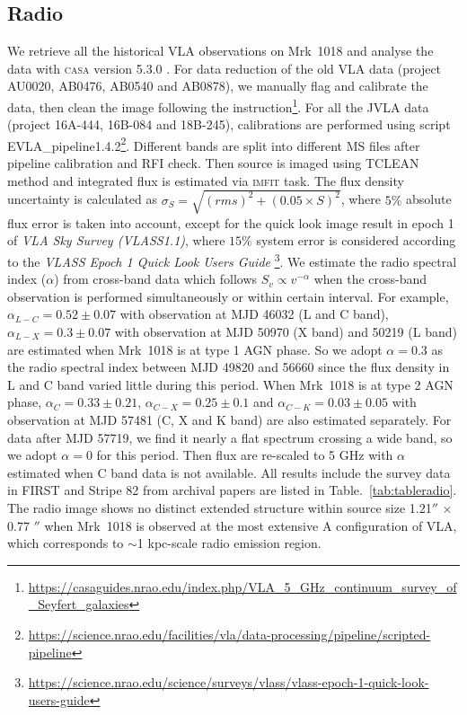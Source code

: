 \documentclass[twocolumn]{aastex63}
\begin{document}
\subsection{Radio}
\label{subsec:vla}
We retrieve all the historical VLA observations on Mrk~1018 and analyse the data with \textsc{casa} version 5.3.0 \citep{2007ASPC..376..127M}. For data reduction of the old VLA data (project AU0020, AB0476, AB0540 and AB0878), we manually flag and calibrate the data, then clean the image following the instruction\footnote{\url{https://casaguides.nrao.edu/index.php/VLA_5_GHz_continuum_survey_of_Seyfert_galaxies}}. For all the JVLA data (project 16A-444, 16B-084 and 18B-245), calibrations are performed using script {EVLA\_pipeline1.4.2}\footnote{\url{https://science.nrao.edu/facilities/vla/data-processing/pipeline/scripted-pipeline}}. Different bands are split into different MS files after pipeline calibration and RFI check. Then source is imaged using {\scriptsize TCLEAN} method and integrated flux is estimated via \textsc{imfit} task. The flux density uncertainty is calculated as $\sigma_{S}=\sqrt{(rms)^2+(0.05\times S)^2}$, where $5 \%$ absolute flux error is taken into account, except for the quick look image result in epoch 1 of  {\em VLA Sky Survey (VLASS1.1)}, where $15 \%$ system error is considered according to the {\em VLASS Epoch 1 Quick Look Users Guide} \footnote{\url{https://science.nrao.edu/science/surveys/vlass/vlass-epoch-1-quick-look-users-guide}}. We estimate the radio spectral index ($\alpha$) from cross-band data which follows $S_v \propto v^{-\alpha}$  when the cross-band observation is performed simultaneously or within certain interval. For example, $\alpha_{L-C} =0.52 \pm 0.07$ with observation at MJD 46032 (L and C band), $\alpha_{L-X} =0.3 \pm 0.07$ with observation at MJD 50970 (X band) and 50219 (L band) are estimated when Mrk~1018 is at type 1 AGN phase. So we adopt $\alpha=0.3$ as the radio spectral index between MJD 49820 and 56660 since the flux density in L and C band varied little during this period. When Mrk~1018 is at type 2 AGN phase, $\alpha_{C} =0.33\pm0.21$, $\alpha_{C-X} =0.25\pm0.1$ and $\alpha_{C-K} =0.03\pm0.05$ with observation at MJD 57481 (C, X and K band) are also estimated separately. For data after MJD 57719, we find it nearly a flat spectrum crossing a wide band, so we adopt $\alpha=0$ for this period. Then flux are re-scaled to 5 GHz with $\alpha$ estimated when C band data is not available.  All results include the survey data in FIRST\citep{1994ASPC...61..165B,1995ApJ...450..559B} and Stripe 82\citep{2011AJ....142....3H} from archival papers are listed in Table.~\ref{tab:tableradio}. The radio image shows no distinct extended structure within source size 1.21$''$ $\times$ 0.77 $''$ when Mrk~1018 is observed at the most extensive A configuration of VLA, which corresponds to $\sim$1 kpc-scale radio emission region.
\end{document}
